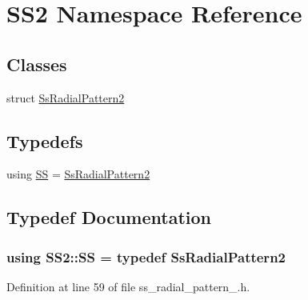 \hypertarget{namespaceSS2}{}\section{S\+S2 Namespace Reference}
\label{namespaceSS2}
\subsection*{Classes}
\begin{DoxyCompactItemize}
\item 
struct \hyperlink{structSS2_1_1SsRadialPattern2}{Ss\+Radial\+Pattern2}
\end{DoxyCompactItemize}
\subsection*{Typedefs}
\begin{DoxyCompactItemize}
\item 
using \hyperlink{namespaceSS2_a4ca9e051bd27f36198a12763036db10c}{SS} = \hyperlink{structSS2_1_1SsRadialPattern2}{Ss\+Radial\+Pattern2}
\end{DoxyCompactItemize}


\subsection{Typedef Documentation}
\subsubsection[{\texorpdfstring{SS}{SS}}]{\setlength{\rightskip}{0pt plus 5cm}using {\bf S\+S2\+::\+SS} = typedef {\bf Ss\+Radial\+Pattern2}}\hypertarget{namespaceSS2_a4ca9e051bd27f36198a12763036db10c}{}\label{namespaceSS2_a4ca9e051bd27f36198a12763036db10c}


Definition at line 59 of file ss\+\_\+radial\+\_\+pattern\+\_.\+h.

